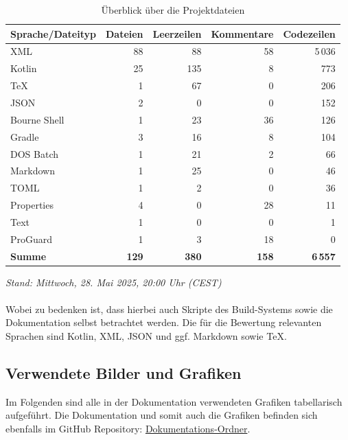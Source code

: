 \documentclass[12pt,a4paper]{article}
\begin{document}
\begin{table}[htbp]
\centering
\caption{Überblick über die Projektdateien}
\begin{tabularx}{\textwidth}{lrrrr}
\toprule
\textbf{Sprache/Dateityp} & \textbf{Dateien} & \textbf{Leerzeilen} & \textbf{Kommentare} & \textbf{Codezeilen} \\
\midrule
XML            & 88  & 88  & 58  & 5\,036 \\
Kotlin         & 25  & 135 & 8   & 773    \\
TeX            & 1   & 67  & 0   & 206    \\
JSON           & 2   & 0   & 0   & 152    \\
Bourne Shell   & 1   & 23  & 36  & 126    \\
Gradle         & 3   & 16  & 8   & 104    \\
DOS Batch      & 1   & 21  & 2   & 66     \\
Markdown       & 1   & 25  & 0   & 46     \\
TOML           & 1   & 2   & 0   & 36     \\
Properties     & 4   & 0   & 28  & 11     \\
Text           & 1   & 0   & 0   & 1      \\
ProGuard       & 1   & 3   & 18  & 0      \\
\midrule
\textbf{Summe} & \textbf{129} & \textbf{380} & \textbf{158} & \textbf{6\,557} \\
\bottomrule
\end{tabularx}
\end{table}

\textit{Stand: Mittwoch, 28. Mai 2025, 20:00 Uhr (CEST)}
\\\\
Wobei zu bedenken ist, dass hierbei auch Skripte des Build-Systems sowie die Dokumentation selbst betrachtet werden. Die für die Bewertung relevanten Sprachen sind Kotlin, XML, JSON und ggf. Markdown sowie TeX.

\newpage
\subsection*{Verwendete Bilder und Grafiken}

Im Folgenden sind alle in der Dokumentation verwendeten Grafiken tabellarisch aufgeführt. Die Dokumentation und somit auch die Grafiken befinden sich ebenfalls im GitHub Repository: \href{https://github.com/Erik-Donath/Palabra/tree/cc55c524ebff2f6db85a36f6ec2c0afb23070e2f/docs}{Dokumentations-Ordner}.
\end{document}
